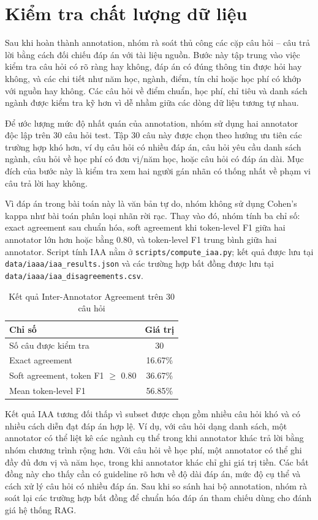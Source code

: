 \documentclass[12pt,a4paper]{report}
\begin{document}
\section{Kiểm tra chất lượng dữ liệu}

Sau khi hoàn thành annotation, nhóm rà soát thủ công các cặp câu hỏi -- câu trả lời bằng cách đối chiếu đáp án với tài liệu nguồn. Bước này tập trung vào việc kiểm tra câu hỏi có rõ ràng hay không, đáp án có đúng thông tin được hỏi hay không, và các chi tiết như năm học, ngành, điểm, tín chỉ hoặc học phí có khớp với nguồn hay không. Các câu hỏi về điểm chuẩn, học phí, chỉ tiêu và danh sách ngành được kiểm tra kỹ hơn vì dễ nhầm giữa các dòng dữ liệu tương tự nhau.

Để ước lượng mức độ nhất quán của annotation, nhóm sử dụng hai annotator độc lập trên 30 câu hỏi test. Tập 30 câu này được chọn theo hướng ưu tiên các trường hợp khó hơn, ví dụ câu hỏi có nhiều đáp án, câu hỏi yêu cầu danh sách ngành, câu hỏi về học phí có đơn vị/năm học, hoặc câu hỏi có đáp án dài. Mục đích của bước này là kiểm tra xem hai người gán nhãn có thống nhất về phạm vi câu trả lời hay không.

Vì đáp án trong bài toán này là văn bản tự do, nhóm không sử dụng Cohen's kappa như bài toán phân loại nhãn rời rạc. Thay vào đó, nhóm tính ba chỉ số: exact agreement sau chuẩn hóa, soft agreement khi token-level F1 giữa hai annotator lớn hơn hoặc bằng 0.80, và token-level F1 trung bình giữa hai annotator. Script tính IAA nằm ở \texttt{scripts/compute\_iaa.py}; kết quả được lưu tại \texttt{data/iaaa/iaa\_results.json} và các trường hợp bất đồng được lưu tại \texttt{data/iaaa/iaa\_disagreements.csv}.

\begin{table}[H]
\centering
\caption{Kết quả Inter-Annotator Agreement trên 30 câu hỏi}
\begin{tabular}{|l|c|}
\hline
\textbf{Chỉ số} & \textbf{Giá trị} \\
\hline
Số câu được kiểm tra & 30 \\
\hline
Exact agreement & 16.67\% \\
\hline
Soft agreement, token F1 $\geq$ 0.80 & 36.67\% \\
\hline
Mean token-level F1 & 56.85\% \\
\hline
\end{tabular}
\end{table}

Kết quả IAA tương đối thấp vì subset được chọn gồm nhiều câu hỏi khó và có nhiều cách diễn đạt đáp án hợp lệ. Ví dụ, với câu hỏi dạng danh sách, một annotator có thể liệt kê các ngành cụ thể trong khi annotator khác trả lời bằng nhóm chương trình rộng hơn. Với câu hỏi về học phí, một annotator có thể ghi đầy đủ đơn vị và năm học, trong khi annotator khác chỉ ghi giá trị tiền. Các bất đồng này cho thấy cần có guideline rõ hơn về độ dài đáp án, mức độ cụ thể và cách xử lý câu hỏi có nhiều đáp án. Sau khi so sánh hai bộ annotation, nhóm rà soát lại các trường hợp bất đồng để chuẩn hóa đáp án tham chiếu dùng cho đánh giá hệ thống RAG.
\end{document}
